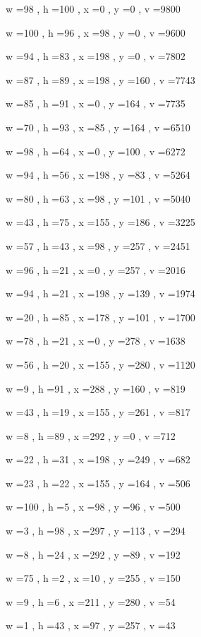 \documentclass[11pt]{article}
\begin{document}
w =98 , h =100 , x =0 , y =0 , v =9800
\par
w =100 , h =96 , x =98 , y =0 , v =9600
\par
w =94 , h =83 , x =198 , y =0 , v =7802
\par
w =87 , h =89 , x =198 , y =160 , v =7743
\par
w =85 , h =91 , x =0 , y =164 , v =7735
\par
w =70 , h =93 , x =85 , y =164 , v =6510
\par
w =98 , h =64 , x =0 , y =100 , v =6272
\par
w =94 , h =56 , x =198 , y =83 , v =5264
\par
w =80 , h =63 , x =98 , y =101 , v =5040
\par
w =43 , h =75 , x =155 , y =186 , v =3225
\par
w =57 , h =43 , x =98 , y =257 , v =2451
\par
w =96 , h =21 , x =0 , y =257 , v =2016
\par
w =94 , h =21 , x =198 , y =139 , v =1974
\par
w =20 , h =85 , x =178 , y =101 , v =1700
\par
w =78 , h =21 , x =0 , y =278 , v =1638
\par
w =56 , h =20 , x =155 , y =280 , v =1120
\par
w =9 , h =91 , x =288 , y =160 , v =819
\par
w =43 , h =19 , x =155 , y =261 , v =817
\par
w =8 , h =89 , x =292 , y =0 , v =712
\par
w =22 , h =31 , x =198 , y =249 , v =682
\par
w =23 , h =22 , x =155 , y =164 , v =506
\par
w =100 , h =5 , x =98 , y =96 , v =500
\par
w =3 , h =98 , x =297 , y =113 , v =294
\par
w =8 , h =24 , x =292 , y =89 , v =192
\par
w =75 , h =2 , x =10 , y =255 , v =150
\par
w =9 , h =6 , x =211 , y =280 , v =54
\par
w =1 , h =43 , x =97 , y =257 , v =43
\par
\newpage
\end{document}

